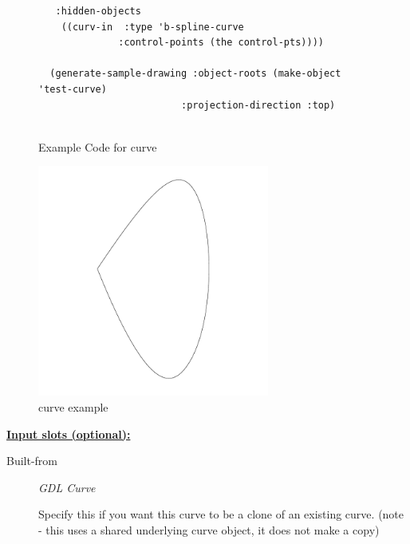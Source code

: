 \documentclass [11pt]{book}
\begin{document}
\begin{itemize}
\begin{figure}
\begin{lrbox}{\boxedverb}
\begin{minipage}{\linewidth}
{\begin{verbatim}
   :hidden-objects
    ((curv-in  :type 'b-spline-curve
              :control-points (the control-pts))))

  (generate-sample-drawing :object-roots (make-object 'test-curve)
                         :projection-direction :top)
  
\end{verbatim}}
\end{minipage}
\end{lrbox}
\fbox{\usebox{\boxedverb}}

\caption{Example Code for curve}

\label{fig:example-code-curve}

\end{figure}

\begin{figure}
\begin{center}
\includegraphics[width=3in,height=3in]{../images/example-curve.pdf}
\end{center}

\caption{curve example}

\label{fig:curve}

\end{figure}





\textbf{
\underline{Input slots (optional):}}

\begin{description}

\item [Built-from]
\emph{GDL Curve}

 Specify this if you want this curve to be a clone of
an existing curve. (note - this uses a shared underlying curve object,
it does not make a copy)





\end{description}
\end{itemize}
\end{document}
